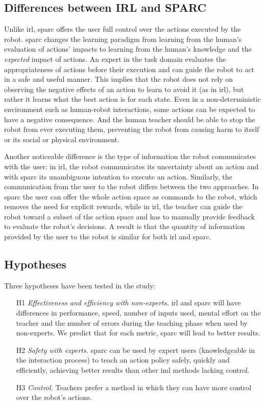 \subsection{Differences between IRL and SPARC}

Unlike \gls{irl}, \gls{sparc} offers the user full control over the actions executed by the robot. \gls{sparc} changes the learning paradigm from learning from the human's evaluation of actions' impacts to learning from the human's knowledge and the \emph{expected} impact of actions. An expert in the task domain evaluates the appropriateness of actions before their execution and can guide the robot to act in a safe and useful manner. This implies that the robot does not rely on observing the negative effects of an action to learn to avoid it (as in \gls{irl}), but rather it learns what the best action is for each state. Even in a non-deterministic environment such as human-robot interactions, some actions can be expected to have a negative consequence. And the human teacher should be able to stop the robot from ever executing them, preventing the robot from causing harm to itself or its social or physical environment. 

Another noticeable difference is the type of information the robot communicates with the user: in \gls{irl}, the robot communicates its uncertainty about an action and with \gls{sparc} its unambiguous intention to execute an action. Similarly, the communication from the user to the  robot differs between the two approaches. In \gls{sparc} the user can offer the whole action space as commands to the robot, which removes the need for explicit rewards, while in \gls{irl}, the teacher can guide the robot toward a subset of the action space and has to manually provide feedback to evaluate the robot's decisions. A result is that the quantity of information provided by the user to the robot is similar for both \gls{irl} and \gls{sparc}. 

\subsection{Hypotheses}

Three hypotheses have been tested in the study:
\begin{enumerate}
	\item [H1] \textit{Effectiveness and efficiency with non-experts.} \gls{irl} and \gls{sparc} will have differences in performance, speed, number of inputs used, mental effort on the teacher and the number of errors during the teaching phase when used by non-experts. We predict that for each metric, \gls{sparc} will lead to better results.
	\item [H2] \textit{Safety with experts.} \gls{sparc} can be used by expert users (knowledgeable in the interaction process) to teach an action policy safely, quickly and efficiently, achieving better results than other \gls{iml} methods lacking control.
	\item [H3] \textit{Control.} Teachers prefer a method in which they can have more control over the robot's actions.
\end{enumerate}
